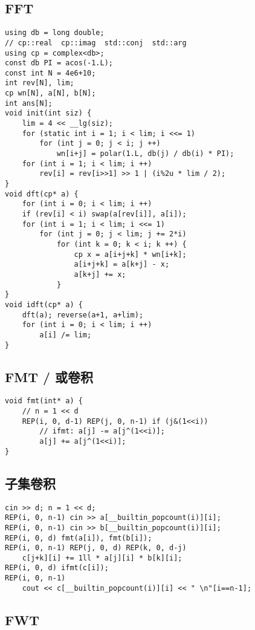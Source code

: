 \documentclass[a4paper,landscape,twocolumn]{ctexart}
\begin{document}
\subsection{FFT}

\begin{lstlisting}
using db = long double;
// cp::real  cp::imag  std::conj  std::arg
using cp = complex<db>;
const db PI = acos(-1.L);
const int N = 4e6+10;
int rev[N], lim;
cp wn[N], a[N], b[N];
int ans[N];
void init(int siz) {
	lim = 4 << __lg(siz);
	for (static int i = 1; i < lim; i <<= 1)
		for (int j = 0; j < i; j ++)
			wn[i+j] = polar(1.L, db(j) / db(i) * PI);
	for (int i = 1; i < lim; i ++)
		rev[i] = rev[i>>1] >> 1 | (i%2u * lim / 2);
}
void dft(cp* a) {
	for (int i = 0; i < lim; i ++)
	if (rev[i] < i) swap(a[rev[i]], a[i]);
	for (int i = 1; i < lim; i <<= 1)
		for (int j = 0; j < lim; j += 2*i)
			for (int k = 0; k < i; k ++) {
				cp x = a[i+j+k] * wn[i+k];
				a[i+j+k] = a[k+j] - x;
				a[k+j] += x;
			}
}
void idft(cp* a) {
	dft(a); reverse(a+1, a+lim);
	for (int i = 0; i < lim; i ++)
		a[i] /= lim;
}
\end{lstlisting}

\subsection{FMT / 或卷积}

\begin{lstlisting}
void fmt(int* a) {
	// n = 1 << d
	REP(i, 0, d-1) REP(j, 0, n-1) if (j&(1<<i))
		// ifmt: a[j] -= a[j^(1<<i)];
		a[j] += a[j^(1<<i)];
}
\end{lstlisting}

\subsection{子集卷积}

\begin{lstlisting}
cin >> d; n = 1 << d;
REP(i, 0, n-1) cin >> a[__builtin_popcount(i)][i];
REP(i, 0, n-1) cin >> b[__builtin_popcount(i)][i];
REP(i, 0, d) fmt(a[i]), fmt(b[i]);
REP(i, 0, n-1) REP(j, 0, d) REP(k, 0, d-j)
	c[j+k][i] += 1ll * a[j][i] * b[k][i];
REP(i, 0, d) ifmt(c[i]);
REP(i, 0, n-1)
	cout << c[__builtin_popcount(i)][i] << " \n"[i==n-1];
\end{lstlisting}

\subsection{FWT}
\end{document}
